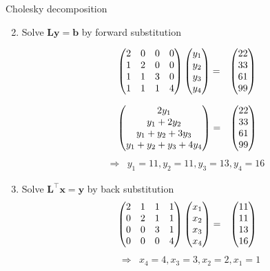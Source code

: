 \begin{vbframe}{Cholesky decomposition}
\begin{enumerate}
\setcounter{enumi}{1}

\item Solve $\mathbf{Ly} = \mathbf{b}$ by forward substitution


\begin{eqnarray*}
\begin{pmatrix} 
  2 & 0 & 0 & 0 \\
  1 & 2 & 0 & 0 \\
  1 & 1 & 3 & 0 \\
  1 & 1 & 1 & 4  \end{pmatrix}
\begin{pmatrix} 
  y_1 \\
  y_2 \\
  y_3 \\
  y_4  \end{pmatrix}
&=& \begin{pmatrix} 
  22 \\
  33 \\
  61 \\
  99  \end{pmatrix} \\
\end{eqnarray*}

\vspace*{-0.5cm}

\begin{eqnarray*}
\begin{pmatrix} 
  2y_1 \\
  y_1 + 2y_2 \\
  y_1 + y_2 + 3y_3 \\
  y_1 + y_2 + y_3 + 4y_4  \end{pmatrix}
&=& \begin{pmatrix} 
  22 \\
  33 \\
  61 \\
  99  \end{pmatrix} \\
\end{eqnarray*}
\begin{eqnarray*}
\Rightarrow&  y_1 = 11, y_2 = 11, y_3 = 13, y_4 = 16
\end{eqnarray*}

\normalsize
\framebreak
\medskip
\item Solve $\mathbf{L}^\top \mathbf{x}=\mathbf{y}$ by back substitution
\begin{eqnarray*}
\begin{pmatrix} 
2 & 1 & 1 & 1 \\
0 & 2 & 1 & 1 \\
0 & 0 & 3 & 1 \\
0 & 0 & 0 & 4  \end{pmatrix}
\begin{pmatrix} 
x_1 \\
x_2 \\
x_3 \\
x_4  \end{pmatrix}
&=& \begin{pmatrix} 
11 \\
11 \\
13 \\
16  \end{pmatrix} \\
\end{eqnarray*}
\begin{eqnarray*}
&\Rightarrow& x_4 = 4, x_3 = 3, x_2 = 2, x_1 = 1
\end{eqnarray*}
\end{enumerate}
\framebreak


\end{vbframe}
